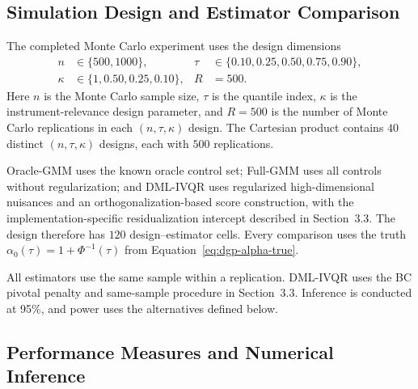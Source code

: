 \subsection{Simulation Design and Estimator Comparison}

The completed Monte Carlo experiment uses the design dimensions
\begin{equation}
  \begin{aligned}
    n&\in\{500,1000\},
    &\tau&\in\{0.10,0.25,0.50,0.75,0.90\},\\
    \kappa&\in\{1,0.50,0.25,0.10\},
    &R&=500.
  \end{aligned}
  \label{eq:simulation-design}
\end{equation}
Here $n$ is the Monte Carlo sample size, $\tau$ is the quantile index, $\kappa$ is the instrument-relevance design parameter, and $R=500$ is the number of Monte Carlo replications in each $(n,\tau,\kappa)$ design. The Cartesian product contains $40$ distinct $(n,\tau,\kappa)$ designs, each with $500$ replications.

Oracle-GMM uses the known oracle control set; Full-GMM uses all controls without regularization; and DML-IVQR uses regularized high-dimensional nuisances and an orthogonalization-based score construction, with the implementation-specific residualization intercept described in Section~3.3. The design therefore has $120$ design--estimator cells. Every comparison uses the truth $\alpha_0(\tau)=1+\Phi^{-1}(\tau)$ from Equation~\eqref{eq:dgp-alpha-true}.

All estimators use the same sample within a replication. DML-IVQR uses the BC pivotal penalty and same-sample procedure in Section~3.3. Inference is conducted at 95\%, and power uses the alternatives defined below.

\subsection{Performance Measures and Numerical Inference}
\label{sec:performance-measures}

